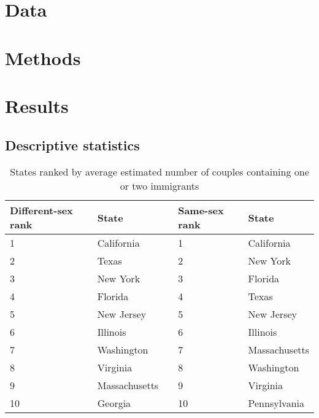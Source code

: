 \documentclass[11pt,]{article}
\begin{document}
\vskip -8.5pt



\noindent  

\hypertarget{data}{%
\section{Data}\label{data}}

\hypertarget{methods}{%
\section{Methods}\label{methods}}

\hypertarget{results}{%
\section{Results}\label{results}}

\hypertarget{descriptive-statistics}{%
\subsection{Descriptive statistics}\label{descriptive-statistics}}

\begin{table}

\caption{\label{tab:state-table}States ranked by average estimated number of couples containing one or two immigrants}
\centering
\begin{tabular}[t]{lllll}
\toprule
Different-sex rank & State  &   & Same-sex rank & State\\
\midrule
1 & California &  & 1 & California\\
2 & Texas &  & 2 & New York\\
3 & New York &  & 3 & Florida\\
4 & Florida &  & 4 & Texas\\
5 & New Jersey &  & 5 & New Jersey\\
6 & Illinois &  & 6 & Illinois\\
7 & Washington &  & 7 & Massachusetts\\
8 & Virginia &  & 8 & Washington\\
9 & Massachusetts &  & 9 & Virginia\\
10 & Georgia &  & 10 & Pennsylvania\\
\bottomrule
\end{tabular}
\end{table}
\end{document}
